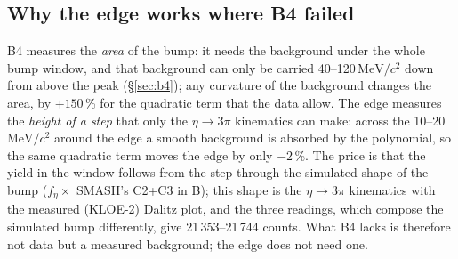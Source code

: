 \documentclass[11pt,a4paper]{article}
\newcommand{\MeVcc}{\ensuremath{\mathrm{MeV}/c^{2}}\xspace}
\begin{document}
\subsection{Why the edge works where B4 failed}
\label{sec:bedge-why}
B4 measures the \emph{area} of the bump: it needs the background under the whole bump window, and that background can only be carried
40--120\,\MeVcc down from above the peak (\S\ref{sec:b4}); any curvature of the background changes the area, by $+150$\,\% for the quadratic term
that the data allow. The edge measures the \emph{height of a step} that only the $\eta\to3\pi$ kinematics can make: across the 10--20\,\MeVcc around
the edge a smooth background is absorbed by the polynomial, so the same quadratic term moves the edge by only $-2$\,\%. The price is that the
yield in the window follows from the step through the simulated shape of the bump ($f_\eta\times$ SMASH's C2+C3 in B); this shape is the
$\eta\to3\pi$ kinematics with the measured (KLOE-2) Dalitz plot, and the three readings, which compose the simulated bump differently, give
21\,353--21\,744 counts. What B4 lacks is therefore not data but a measured background; the edge does not need one.
\end{document}
